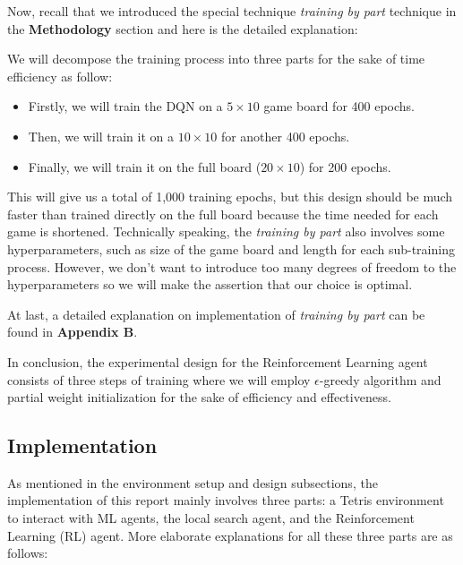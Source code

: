 \documentclass[letterpaper]{article} %
\begin{document}
\begin{itemize}
  Now, recall that we introduced the special technique \textit{training by part} technique in the \textbf{Methodology} section and here is the detailed explanation:
  
  We will decompose the training process into three parts for the sake of time efficiency as follow:
  \begin{itemize}
    \item 
    Firstly, we will train the DQN on a $5\times 10$ game board for 400 epochs.
    \item 
    Then, we will train it on a $10\times 10$ for another 400 epochs.
    \item 
    Finally, we will train it on the full board ($20\times 10$) for 200 epochs.
  \end{itemize}

  
  
  This will give us a total of 1,000 training epochs, but this design should be much faster than trained directly on the full board because the time needed for each game is shortened. Technically speaking, the \textit{training by part} also involves some hyperparameters, such as size of the game board and length for each sub-training process. However, we don't want to introduce too many degrees of freedom to the hyperparameters so we will make the assertion that our choice is optimal.
  
  At last, a detailed explanation on implementation of \textit{training by part} can be found in \textbf{Appendix B}.
  

  In conclusion, the experimental design for the Reinforcement Learning agent consists of three steps of training where we will employ $\epsilon$-greedy algorithm and partial weight initialization for the sake of efficiency and effectiveness. 
\end{itemize}

\subsection{Implementation}

As mentioned in the environment setup and design subsections, the implementation of this report mainly involves three parts: a Tetris environment to interact with ML agents, the local search agent, and the Reinforcement Learning (RL) agent. More elaborate explanations for all these three parts are as follows:
\end{document}
